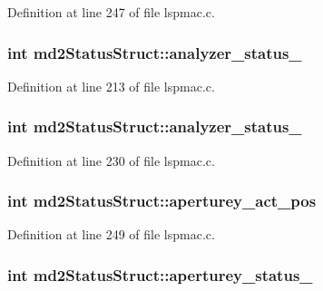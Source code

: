 Definition at line 247 of file lspmac.\-c.

\hypertarget{structmd2StatusStruct_ab876b484f55bcce576fcd89dcc3f7267}{
\subsubsection[{analyzer\-\_\-status\-\_\-1}]{\setlength{\rightskip}{0pt plus 5cm}int md2\-Status\-Struct\-::analyzer\-\_\-status\-\_}}\label{structmd2StatusStruct_ab876b484f55bcce576fcd89dcc3f7267}


Definition at line 213 of file lspmac.\-c.

\hypertarget{structmd2StatusStruct_a4f88bb778e4e18f1fbf7672ac11e7433}{
\subsubsection[{analyzer\-\_\-status\-\_\-2}]{\setlength{\rightskip}{0pt plus 5cm}int md2\-Status\-Struct\-::analyzer\-\_\-status\-\_}}\label{structmd2StatusStruct_a4f88bb778e4e18f1fbf7672ac11e7433}


Definition at line 230 of file lspmac.\-c.

\hypertarget{structmd2StatusStruct_a2a434d2b57dbb669de0765486a1516ff}{
\subsubsection[{aperturey\-\_\-act\-\_\-pos}]{\setlength{\rightskip}{0pt plus 5cm}int md2\-Status\-Struct\-::aperturey\-\_\-act\-\_\-pos}}\label{structmd2StatusStruct_a2a434d2b57dbb669de0765486a1516ff}


Definition at line 249 of file lspmac.\-c.

\hypertarget{structmd2StatusStruct_a2ef953eaddf7058bf4276585e6ff066b}{
\subsubsection[{aperturey\-\_\-status\-\_\-1}]{\setlength{\rightskip}{0pt plus 5cm}int md2\-Status\-Struct\-::aperturey\-\_\-status\-\_}}\label{structmd2StatusStruct_a2ef953eaddf7058bf4276585e6ff066b}


